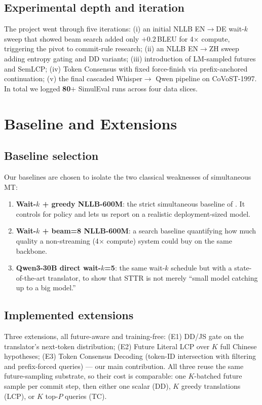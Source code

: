 \documentclass{article}
\begin{document}
\subsection{Experimental depth and iteration}
The project went through five iterations: (i) an initial NLLB EN$\rightarrow$DE wait-$k$
sweep that showed beam search added only $+0.2$\,BLEU for 4$\times$ compute, triggering the
pivot to commit-rule research; (ii) an NLLB EN$\rightarrow$ZH sweep adding entropy gating and
DD variants; (iii) introduction of LM-sampled futures and SemLCP; (iv) Token Consensus with
fixed force-finish via prefix-anchored continuation; (v) the final cascaded Whisper$\rightarrow$
Qwen pipeline on CoVoST-1997. In total we logged \textbf{80$+$} SimulEval runs across four
data slices.

\section{Baseline and Extensions}
\label{sec:baseline}

\subsection{Baseline selection}
Our baselines are chosen to isolate the two classical weaknesses of simultaneous MT:
\begin{enumerate}\itemsep0pt
  \item \textbf{Wait-$k$ + greedy NLLB-600M}: the strict simultaneous baseline of
  \citet{ma2019stacl}. It controls for policy and lets us report on a realistic deployment-sized
  model.
  \item \textbf{Wait-$k$ + beam=8 NLLB-600M}: a search baseline quantifying how much quality a
  non-streaming (4$\times$ compute) system could buy on the same backbone.
  \item \textbf{Qwen3-30B direct wait-$k$=5}: the same wait-$k$ schedule but with a
  state-of-the-art translator, to show that STTR is not merely ``small model catching up to a big
  model.''
\end{enumerate}

\subsection{Implemented extensions}
Three extensions, all future-aware and training-free:
(E1) DD/JS gate on the translator's next-token distribution;
(E2) Future Literal LCP over $K$ full Chinese hypotheses;
(E3) Token Consensus Decoding (token-ID intersection with filtering and prefix-forced
queries) --- our main contribution. All three reuse the same future-sampling substrate, so their
cost is comparable: one $K$-batched future sample per commit step, then either one scalar
(DD), $K$ greedy translations (LCP), or $K$ top-$P$ queries (TC).
\end{document}
